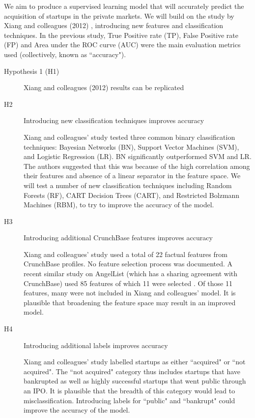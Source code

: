 \documentclass[../thesis/thesis.tex]{subfiles}
\begin{document}
We aim to produce a supervised learning model that will accurately predict the acquisition of startups in the private markets. We will build on the study by Xiang and colleagues (2012) \cite{xiang2012}, introducing new features and classification techniques. In the previous study, True Positive rate (TP), False Positive rate (FP) and Area under the ROC curve (AUC) were the main evaluation metrics used (collectively, known as ``accuracy").

\begin{description}
\item[Hypothesis 1 (H1)] Xiang and colleagues (2012) \cite{xiang2012} results can be replicated

\item[H2] Introducing new classification techniques improves accuracy

Xiang and colleagues' study tested three common binary classification techniques: Bayesian Networks (BN), Support Vector Machines (SVM), and Logistic Regression (LR). BN significantly outperformed SVM and LR. The authors suggested that this was because of the high correlation among their features and absence of a linear separator in the feature space. We will test a number of new classification techniques including Random Forests (RF), CART Decision Trees (CART), and Restricted Bolzmann Machines (RBM), to try to improve the accuracy of the model.

\item[H3] Introducing additional CrunchBase features improves accuracy

Xiang and colleagues' study used a total of 22 factual features from CrunchBase profiles. No feature selection process was documented. A recent similar study on AngelList (which has a sharing agreement with CrunchBase) used 85 features of which 11 were selected \cite{beckwith2016}. Of those 11 features, many were not included in Xiang and colleagues' model. It is plausible that broadening the feature space may result in an improved model.

\item[H4] Introducing additional labels improves accuracy

Xiang and colleagues' study labelled startups as either ``acquired" or ``not acquired". The ``not acquired" category thus includes startups that have bankrupted as well as highly successful startups that went public through an IPO. It is plausible that the breadth of this category would lead to misclassification. Introducing labels for ``public" and ``bankrupt" could improve the accuracy of the model.


\end{description}
\end{document}
